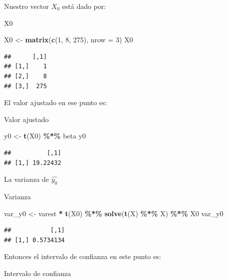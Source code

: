 \documentclass[
]{book}
\newenvironment{Shaded}{\begin{snugshade}}{\end{snugshade}}
\newcommand{\AttributeTok}[1]{\textcolor[rgb]{0.13,0.29,0.53}{#1}}
\newcommand{\DecValTok}[1]{\textcolor[rgb]{0.00,0.00,0.81}{#1}}
\newcommand{\FunctionTok}[1]{\textcolor[rgb]{0.13,0.29,0.53}{\textbf{#1}}}
\newcommand{\NormalTok}[1]{#1}
\newcommand{\OtherTok}[1]{\textcolor[rgb]{0.56,0.35,0.01}{#1}}
\newcommand{\SpecialCharTok}[1]{\textcolor[rgb]{0.81,0.36,0.00}{\textbf{#1}}}
\begin{document}
Nuestro vector \(X_0\) está dado por:

X0

\begin{Shaded}
\begin{Highlighting}[]
\NormalTok{X0 }\OtherTok{\textless{}{-}} \FunctionTok{matrix}\NormalTok{(}\FunctionTok{c}\NormalTok{(}\DecValTok{1}\NormalTok{, }\DecValTok{8}\NormalTok{, }\DecValTok{275}\NormalTok{), }\AttributeTok{nrow =} \DecValTok{3}\NormalTok{)}
\NormalTok{X0}
\end{Highlighting}
\end{Shaded}

\begin{verbatim}
##      [,1]
## [1,]    1
## [2,]    8
## [3,]  275
\end{verbatim}

El valor ajustado en ese punto es:

Valor ajustado

\begin{Shaded}
\begin{Highlighting}[]
\NormalTok{y0 }\OtherTok{\textless{}{-}} \FunctionTok{t}\NormalTok{(X0) }\SpecialCharTok{\%*\%}\NormalTok{ beta}
\NormalTok{y0}
\end{Highlighting}
\end{Shaded}

\begin{verbatim}
##          [,1]
## [1,] 19.22432
\end{verbatim}

La varianza de \(\hat{y_0}\)

Varianza

\begin{Shaded}
\begin{Highlighting}[]
\NormalTok{var\_y0 }\OtherTok{\textless{}{-}}\NormalTok{ varest }\SpecialCharTok{*} \FunctionTok{t}\NormalTok{(X0) }\SpecialCharTok{\%*\%} \FunctionTok{solve}\NormalTok{(}\FunctionTok{t}\NormalTok{(X) }\SpecialCharTok{\%*\%}\NormalTok{ X) }\SpecialCharTok{\%*\%}\NormalTok{ X0}
\NormalTok{var\_y0}
\end{Highlighting}
\end{Shaded}

\begin{verbatim}
##           [,1]
## [1,] 0.5734134
\end{verbatim}

Entonces el intervalo de confianza en este punto es:

Intervalo de confianza
\end{document}
